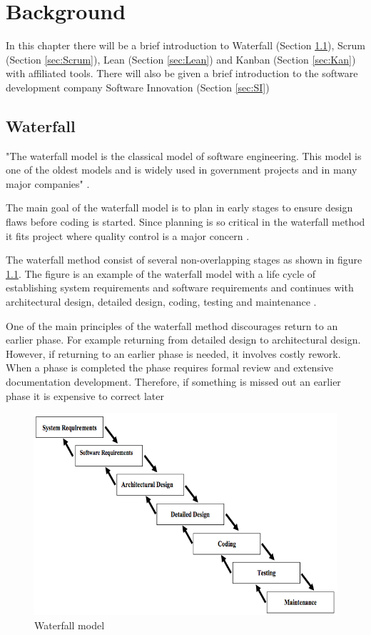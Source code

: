 \documentclass[UKenglish]{ifimaster}  %
\begin{document}
\chapter{Background}  
\label{chap:Background}                %
In this chapter there will be a brief introduction to Waterfall (Section \ref{sec:WP}), Scrum (Section \ref{sec:Scrum}), Lean (Section \ref{sec:Lean}) and Kanban (Section \ref{sec:Kan}) with affiliated tools. There will also be given a brief introduction to the software development company Software Innovation (Section \ref{sec:SI})

\section {Waterfall}
\label{sec:WP}
"The waterfall model is the classical model of software engineering. This model is one of the oldest models and is widely used in government projects and in many major companies" \parencite{munassar2010comparison}.

The main goal of the waterfall model is to plan in early stages to ensure design flaws before coding is started. Since planning is so critical in the waterfall method it fits project where quality control is a major concern  \parencite{munassar2010comparison}.

The waterfall method consist of several non-overlapping stages as shown in figure \ref{fig:waterfall}. The figure is an example of the waterfall model with a life cycle of establishing system requirements and software requirements and continues with architectural design, detailed design, coding, testing and maintenance  \parencite{munassar2010comparison}.

One of the main principles of the waterfall method discourages return to an earlier phase. For example returning from detailed design to architectural design. However, if returning to an earlier phase is needed, it involves costly rework. When a phase is completed the phase requires formal review and extensive documentation development. Therefore, if something is missed out an earlier phase it is expensive to correct later  \parencite{munassar2010comparison}


\begin{figure}[ht!]
\centering
\includegraphics[scale=0.7]{Picture/waterfall.jpg}
\caption{Waterfall model}
\label{fig:waterfall} %
\end{figure}
\end{document}
